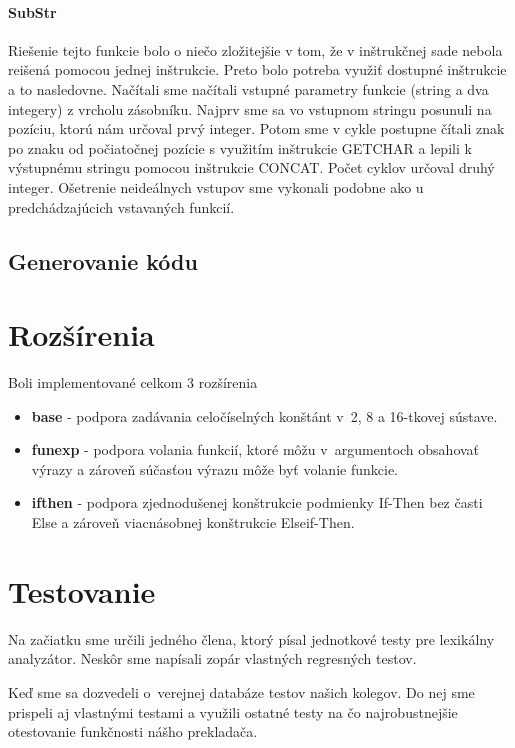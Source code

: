 \documentclass{article}
\begin{document}
            \paragraph{SubStr}
            Riešenie tejto funkcie bolo o niečo zložitejšie v tom, že v inštrukčnej sade nebola reišená pomocou jednej
            inštrukcie. Preto bolo potreba využiť dostupné inštrukcie a to nasledovne. Načítali sme načítali vstupné parametry
            funkcie (string a dva integery) z vrcholu zásobníku. Najprv sme sa vo vstupnom stringu posunuli na pozíciu, ktorú nám určoval
            prvý integer. Potom sme v cykle postupne čítali znak po znaku od počiatočnej pozície s využitím inštrukcie GETCHAR a lepili
            k výstupnému stringu pomocou inštrukcie CONCAT. Počet cyklov určoval druhý integer. Ošetrenie neideálnych vstupov sme
            vykonali podobne ako u predchádzajúcich vstavaných funkcií.
            
        \subsection{Generovanie kódu}

    \section{Rozšírenia}
    Boli implementované celkom 3 rozšírenia
        \begin{itemize}
            \item \textbf{base}   - podpora zadávania celočíselných konštánt v~2, 8 a 16-tkovej sústave.
            \item \textbf{funexp} - podpora volania funkcií, ktoré môžu v~argumentoch obsahovať výrazy
                                        a zároveň súčasťou výrazu môže byť volanie funkcie.
            \item  \textbf{ifthen} - podpora zjednodušenej konštrukcie podmienky If-Then bez časti Else
                                        a zároveň viacnásobnej konštrukcie Elseif-Then.
        \end{itemize}

    \section{Testovanie}
    Na začiatku sme určili jedného člena, ktorý písal jednotkové testy pre lexikálny analyzátor.
    Neskôr sme napísali zopár vlastných regresných testov.

    Keď sme sa dozvedeli o~verejnej databáze testov našich kolegov. Do nej sme prispeli aj vlastnými testami a využili ostatné testy na čo najrobustnejšie otestovanie funkčnosti nášho prekladača.
\end{document}
